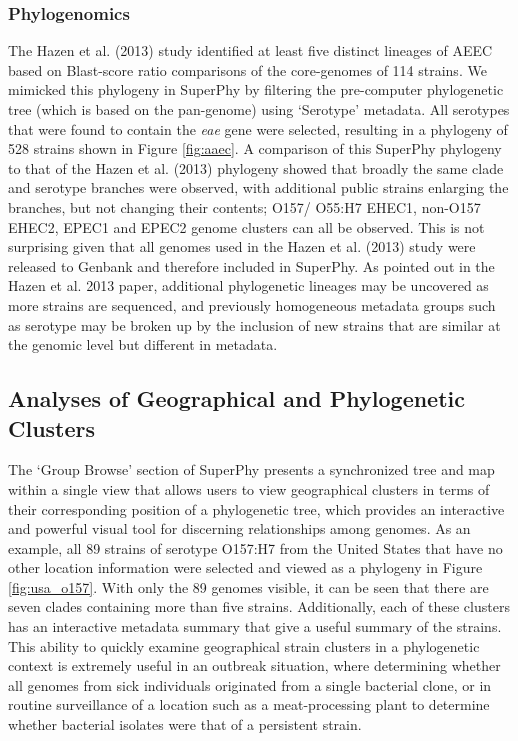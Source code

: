 \documentclass[doublespacing, linenumbers]{bmcart}
\begin{document}
\subsubsection{Phylogenomics}
 The Hazen et al. (2013) study identified at least five distinct lineages of AEEC based on Blast-score ratio comparisons of the core-genomes of 114 strains. We mimicked this phylogeny in SuperPhy by filtering the pre-computer phylogenetic tree (which is based on the pan-genome) using `Serotype' metadata. All serotypes that were found to contain the \textit{eae} gene were selected, resulting in a phylogeny of 528 strains shown in Figure \ref{fig:aaec}. A comparison of this SuperPhy phylogeny to that of the Hazen et al. (2013) phylogeny showed that broadly the same clade and serotype branches were observed, with additional public strains enlarging the branches, but not changing their contents; O157/ O55:H7 EHEC1, non-O157 EHEC2, EPEC1 and EPEC2 genome clusters can all be observed. This is not surprising given that all genomes used in the Hazen et al. (2013) study were released to Genbank and therefore included in SuperPhy. As pointed out in the Hazen et al. 2013 paper, additional phylogenetic lineages may be uncovered as more strains are sequenced, and previously homogeneous metadata groups such as serotype may be broken up by the inclusion of new strains that are similar at the genomic level but different in metadata.

\subsection{Analyses of Geographical and Phylogenetic Clusters}
The `Group Browse' section of SuperPhy presents a synchronized tree and map within a single view that allows users to view geographical clusters in terms of their corresponding position of a phylogenetic tree, which provides an interactive and powerful visual tool for discerning relationships among genomes. As an example, all 89 strains of serotype O157:H7 from the United States that have no other location information were selected and viewed as a phylogeny in Figure \ref{fig:usa_o157}.  With only the 89 genomes visible, it can be seen that there are seven clades containing more than five strains. Additionally, each of these clusters has an interactive metadata summary that give a useful summary of the strains. This ability to quickly examine geographical strain clusters in a phylogenetic context is extremely useful in an outbreak situation, where determining whether all genomes from sick individuals originated from a single bacterial clone, or in routine surveillance of a location such as a meat-processing plant to determine whether bacterial isolates were that of a persistent strain. 
\end{document}
